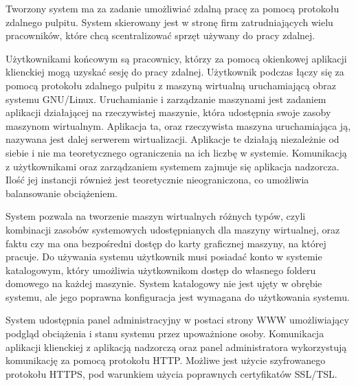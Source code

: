 \documentclass[../wstep.tex]{subfiles}
\begin{document}
Tworzony system ma za zadanie umożliwiać zdalną pracę za pomocą protokołu zdalnego pulpitu. System skierowany jest w stronę firm zatrudniających wielu pracowników, które chcą scentralizować sprzęt używany do pracy zdalnej.

Użytkownikami końcowym są pracownicy, którzy za pomocą okienkowej aplikacji klienckiej mogą uzyskać sesję do pracy zdalnej. Użytkownik podczas łączy się za pomocą protokołu zdalnego pulpitu z maszyną wirtualną uruchamiającą obraz systemu GNU/Linux. Uruchamianie i zarządzanie maszynami jest zadaniem aplikacji działającej na rzeczywistej maszynie, która udostępnia swoje zasoby maszynom wirtualnym. Aplikacja ta, oraz rzeczywista maszyna uruchamiająca ją, nazywana jest dalej serwerem wirtualizacji. Aplikacje te działają niezależnie od siebie i nie ma teoretycznego ograniczenia na ich liczbę w systemie. Komunikacją z użytkownikami oraz zarządzaniem systemem zajmuje się aplikacja nadzorcza. Ilość jej instancji również jest teoretycznie nieograniczona, co umożliwia balansowanie obciążeniem.

System pozwala na tworzenie maszyn wirtualnych różnych typów, czyli kombinacji zasobów systemowych udostępnianych dla maszyny wirtualnej, oraz faktu czy ma ona bezpośredni dostęp do karty graficznej maszyny, na której pracuje. Do używania systemu użytkownik musi posiadać konto w systemie katalogowym, który umożliwia użytkownikom dostęp do własnego folderu domowego na każdej maszynie. System katalogowy nie jest ujęty w obrębie systemu, ale jego poprawna konfiguracja jest wymagana do użytkowania systemu.

System udostępnia panel administracyjny w postaci strony WWW umożliwiający podgląd obciążenia i stanu systemu przez upoważnione osoby. Komunikacja aplikacji klienckiej z aplikacją nadzorczą oraz panel administratora wykorzystują komunikację za pomocą protokołu HTTP. Możliwe jest użycie szyfrowanego protokołu HTTPS, pod warunkiem użycia poprawnych certyfikatów SSL/TSL.
\end{document}
